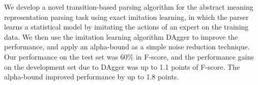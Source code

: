 We develop a novel transition-based parsing algorithm for the abstract meaning representation parsing task using exact imitation learning, in which the parser learns a statistical model by imitating the actions of an expert on the training data. We then use the imitation learning algorithm DAgger to improve the performance, and apply an alpha-bound as a simple noise reduction technique. Our performance on the test set was 60\% in F-score, and the performance gains on the development set due to DAgger was up to 1.1 points of F-score. The alpha-bound improved performance by up to 1.8 points.
